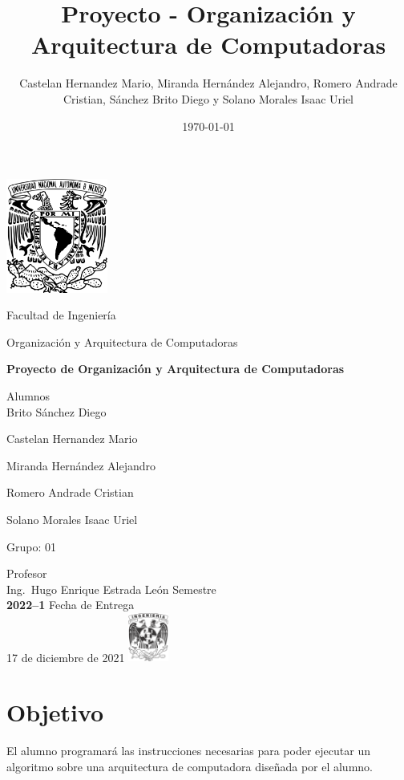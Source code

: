 \documentclass{IEEEtran}
\author{Castelan Hernandez Mario, Miranda Hernández Alejandro, Romero Andrade Cristian, Sánchez Brito Diego y Solano Morales Isaac Uriel}
\date{\today}
\title{Proyecto - Organización y Arquitectura de Computadoras}
\begin{document}
\begin{titlepage}
\centering
\includegraphics[width=0.25\textwidth]{./img_common/unam_logo}\vspace{0.5cm}\\
{\scshape{\Huge Facultad de Ingeniería\par{}}}\vspace{0.25cm}
{\scshape{\Large Organización y Arquitectura de Computadoras\par{}}}\vfill{}
{\huge \textbf{Proyecto de Organización y Arquitectura de Computadoras}}\vfill{}
{\Large Alumnos\\
Brito Sánchez Diego

Castelan Hernandez Mario

Miranda Hernández Alejandro

Romero Andrade Cristian

Solano Morales Isaac Uriel

}\vfill{}
{\large Grupo: 01\par{}}\vfill{}
{\large Profesor\\Ing.~Hugo Enrique Estrada León}\vfill{}
\vfil{}
{\large Semestre\\\textbf{2022--1}}
\vfill{}
{\large Fecha de Entrega\\17 de diciembre de 2021}
\vfill{}
\includegraphics[width=0.1\textwidth]{./img_common/inge_logo}
\end{titlepage}

\maketitle
\tableofcontents

\section{Objetivo}
\label{sec:org3c5fd6a}
El alumno programará las instrucciones necesarias para poder ejecutar un algoritmo sobre una arquitectura de computadora  diseñada por el alumno.
\end{document}
